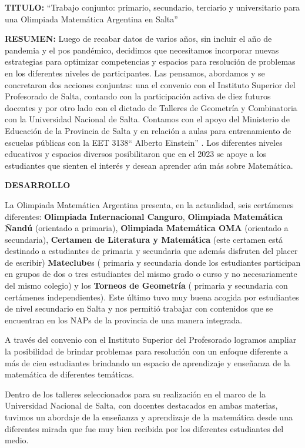 \documentclass[
]{article}
\author{}
\date{}
\begin{document}
\textbf{TITULO:} ``Trabajo conjunto: primario, secundario, terciario y
universitario para una Olimpiada Matemática Argentina en Salta''

\textbf{RESUMEN:} Luego de recabar datos de varios años, sin incluir el
año de pandemia y el pos pandémico, decidimos que necesitamos incorporar
nuevas estrategias para optimizar competencias y espacios para
resolución de problemas en los diferentes niveles de participantes. Las
pensamos, abordamos y se concretaron dos acciones conjuntas: una el
convenio con el Instituto Superior del Profesorado de Salta, contando
con la participación activa de diez futuros docentes y por otro lado con
el dictado de Talleres de Geometría y Combinatoria con la Universidad
Nacional de Salta. Contamos con el apoyo del Ministerio de Educación de
la Provincia de Salta y en relación a aulas para entrenamiento de
escuelas públicas con la EET 3138`` Alberto Einstein'' . Los diferentes
niveles educativos y espacios diversos posibilitaron que en el 2023 se
apoye a los estudiantes que sienten el interés y desean aprender aún más
sobre Matemática.

\textbf{DESARROLLO}

La Olimpiada Matemática Argentina presenta, en la actualidad, seis
certámenes diferentes: \textbf{Olimpiada Internacional Canguro},
\textbf{Olimpiada Matemática Ñandú} (orientado a primaria),
\textbf{Olimpiada Matemática OMA} (orientado a secundaria),
\textbf{Certamen de Literatura y Matemática} (este certamen está
destinado a estudiantes de primaria y secundaria que además disfruten
del placer de escribir) \textbf{Mateclube}s ( primaria y secundaria
donde los estudiantes participan en grupos de dos o tres estudiantes del
mismo grado o curso y no necesariamente del mismo colegio) y los
\textbf{Torneos de Geometría} ( primaria y secundaria con certámenes
independientes). Este último tuvo muy buena acogida por estudiantes de
nivel secundario en Salta y nos permitió trabajar con contenidos que se
encuentran en los NAPs de la provincia de una manera integrada.

A través del convenio con el Instituto Superior del Profesorado logramos
ampliar la posibilidad de brindar problemas para resolución con un
enfoque diferente a más de cien estudiantes brindando un espacio de
aprendizaje y enseñanza de la matemática de diferentes temáticas.

Dentro de los talleres seleccionados para su realización en el marco de
la Universidad Nacional de Salta, con docentes destacados en ambas
materias, tuvimos un abordaje de la enseñanza y aprendizaje de la
matemática desde una diferentes mirada que fue muy bien recibida por los
diferentes estudiantes del medio.
\end{document}
